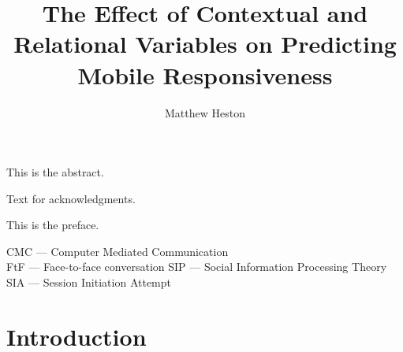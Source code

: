 \documentclass[12pt]{nuthesis}	%
\author{Matthew Heston}
\title{The Effect of Contextual and Relational Variables on Predicting Mobile Responsiveness}
\begin{document}
%	
%


\frontmatter		%

\maketitle		%

\copyrightpage		%


\abstract		%

This is the abstract.

\acknowledgements	%

Text for acknowledgments.

\preface		%

This is the preface.


%
\listofabbreviations
CMC --- Computer Mediated Communication \\
FtF --- Face-to-face conversation
SIP --- Social Information Processing Theory \\
SIA --- Session Initiation Attempt
%
%
%
%
%
%
%

\clearpage{} %
\tableofcontents	%

\clearpage{} %
\listoftables		%

\clearpage{} %
\listoffigures		%



\mainmatter             %



\chapter{Introduction}
\end{document}
